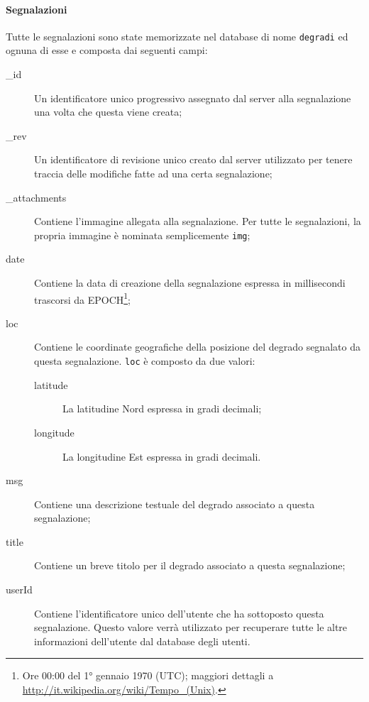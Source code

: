                 \paragraph{Segnalazioni}
                Tutte le segnalazioni sono state memorizzate nel database di
                nome \texttt{degradi} ed ognuna di esse e composta dai seguenti
                campi:
                \begin{description}
                    \item[\_id] Un identificatore unico progressivo assegnato
                    dal server alla segnalazione una volta che questa viene
                    creata;
                    \item[\_rev] Un identificatore di revisione unico creato
                    dal server utilizzato per tenere traccia delle modifiche
                    fatte ad una certa segnalazione;
                    \item[\_attachments] Contiene l'immagine allegata alla
                    segnalazione. Per tutte le segnalazioni, la propria
                    immagine è nominata semplicemente \texttt{img};
                    \item[date] Contiene la data di creazione della
                    segnalazione espressa in millisecondi trascorsi da
                    EPOCH\footnote{Ore 00:00 del 1° gennaio 1970 (UTC);
                    maggiori dettagli a
                    \url{http://it.wikipedia.org/wiki/Tempo_(Unix)}.};
                    \item[loc] Contiene le coordinate geografiche della
                    posizione del degrado segnalato da questa segnalazione.
                    \texttt{loc} è composto da due valori:
                    \begin{description}
                        \item[latitude] La latitudine Nord espressa in gradi
                        decimali;
                        \item[longitude] La longitudine Est espressa in gradi
                        decimali.
                    \end{description}
                    \item[msg] Contiene una descrizione testuale del degrado
                    associato a questa segnalazione;
                    \item[title] Contiene un breve titolo per il degrado
                    associato a questa segnalazione;
                    \item[userId] Contiene l'identificatore unico dell'utente
                    che ha sottoposto questa segnalazione. Questo valore verrà
                    utilizzato per recuperare tutte le altre informazioni
                    dell'utente dal database degli utenti.
                \end{description}

